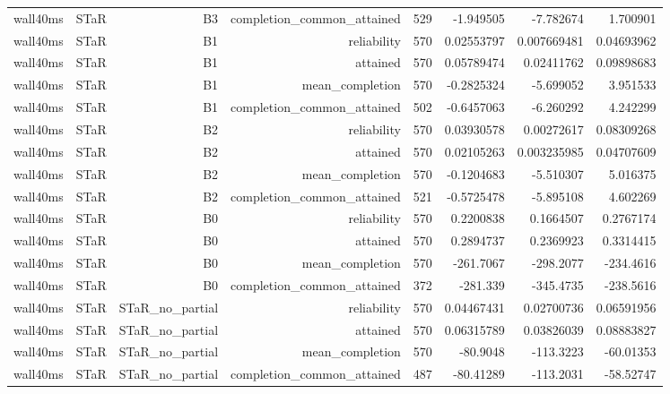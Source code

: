 \begin{longtable}{llrrrrrr}
wall40ms & STaR & B3 & completion\_common\_attained & 529 & -1.949505 & -7.782674 & 1.700901 \\
wall40ms & STaR & B1 & reliability & 570 & 0.02553797 & 0.007669481 & 0.04693962 \\
wall40ms & STaR & B1 & attained & 570 & 0.05789474 & 0.02411762 & 0.09898683 \\
wall40ms & STaR & B1 & mean\_completion & 570 & -0.2825324 & -5.699052 & 3.951533 \\
wall40ms & STaR & B1 & completion\_common\_attained & 502 & -0.6457063 & -6.260292 & 4.242299 \\
wall40ms & STaR & B2 & reliability & 570 & 0.03930578 & 0.00272617 & 0.08309268 \\
wall40ms & STaR & B2 & attained & 570 & 0.02105263 & 0.003235985 & 0.04707609 \\
wall40ms & STaR & B2 & mean\_completion & 570 & -0.1204683 & -5.510307 & 5.016375 \\
wall40ms & STaR & B2 & completion\_common\_attained & 521 & -0.5725478 & -5.895108 & 4.602269 \\
wall40ms & STaR & B0 & reliability & 570 & 0.2200838 & 0.1664507 & 0.2767174 \\
wall40ms & STaR & B0 & attained & 570 & 0.2894737 & 0.2369923 & 0.3314415 \\
wall40ms & STaR & B0 & mean\_completion & 570 & -261.7067 & -298.2077 & -234.4616 \\
wall40ms & STaR & B0 & completion\_common\_attained & 372 & -281.339 & -345.4735 & -238.5616 \\
wall40ms & STaR & STaR\_no\_partial & reliability & 570 & 0.04467431 & 0.02700736 & 0.06591956 \\
wall40ms & STaR & STaR\_no\_partial & attained & 570 & 0.06315789 & 0.03826039 & 0.08883827 \\
wall40ms & STaR & STaR\_no\_partial & mean\_completion & 570 & -80.9048 & -113.3223 & -60.01353 \\
wall40ms & STaR & STaR\_no\_partial & completion\_common\_attained & 487 & -80.41289 & -113.2031 & -58.52747 \\
\hline
\end{longtable}
